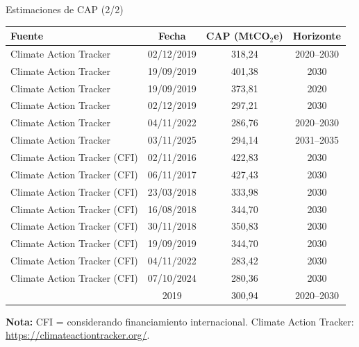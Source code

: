 \documentclass[xcolor=dvipsnames]{beamer}
\begin{document}
\begin{frame}{Estimaciones de CAP (2/2)}

\scriptsize
\begin{center}
    \begin{tabular}{l c c c}
    \toprule
    \textbf{Fuente} & \textbf{Fecha} & \textbf{CAP (MtCO$_2$e)} & \textbf{Horizonte} \\
    \midrule
    Climate Action Tracker & 02/12/2019 & 318,24 & 2020--2030 \\
    Climate Action Tracker & 19/09/2019 & 401,38 & 2030 \\
    Climate Action Tracker & 19/09/2019 & 373,81 & 2020 \\
    Climate Action Tracker & 02/12/2019 & 297,21 & 2030 \\
    Climate Action Tracker & 04/11/2022 & 286,76 & 2020--2030 \\
    Climate Action Tracker & 03/11/2025 & 294,14 & 2031--2035 \\
    \addlinespace
    Climate Action Tracker (CFI) & 02/11/2016 & 422,83 & 2030 \\
    Climate Action Tracker (CFI) & 06/11/2017 & 427,43 & 2030 \\
    Climate Action Tracker (CFI) & 23/03/2018 & 333,98 & 2030 \\
    Climate Action Tracker (CFI) & 16/08/2018 & 344,70 & 2030 \\
    Climate Action Tracker (CFI) & 30/11/2018 & 350,83 & 2030 \\
    Climate Action Tracker (CFI) & 19/09/2019 & 344,70 & 2030 \\
    Climate Action Tracker (CFI) & 04/11/2022 & 283,42 & 2030 \\
    Climate Action Tracker (CFI) & 07/10/2024 & 280,36 & 2030 \\
    \addlinespace
    \cite{palma_behnke_chilean_2019} & 2019 & 300,94 & 2020--2030 \\
    \bottomrule
    \end{tabular}

    \vspace{0.2cm}
    \tiny
    \textbf{Nota:} CFI = considerando financiamiento internacional. 
    Climate Action Tracker: \url{https://climateactiontracker.org/}.
\end{center}
\end{frame}
\end{document}
